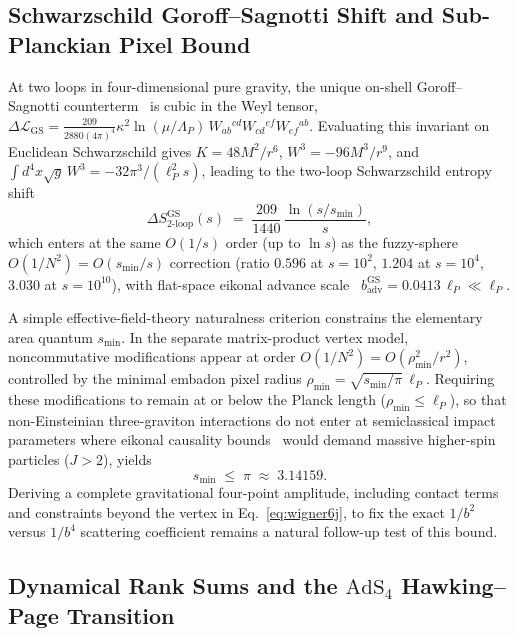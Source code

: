 \documentclass[onecolumn,11pt,aps,prd,amsmath,amssymb,nofootinbib,floatfix]{revtex4-2}
\newcommand{\lP}{\ell_P}
\begin{document}
\subsection{Schwarzschild Goroff--Sagnotti Shift and Sub-Planckian Pixel Bound}\label{sec:uv_cemz}

At two loops in four-dimensional pure gravity, the unique on-shell Goroff--Sagnotti counterterm~\cite{GoroffSagnotti1986} is cubic in the Weyl tensor, $\Delta\mathcal{L}_{\mathrm{GS}}=\frac{209}{2880(4\pi)^4}\kappa^2\ln(\mu/\Lambda_P)\,W_{ab}{}^{cd}W_{cd}{}^{ef}W_{ef}{}^{ab}$. Evaluating this invariant on Euclidean Schwarzschild gives $K=48M^2/r^6$, $W^3=-96M^3/r^9$, and $\int d^4x\sqrt{g}\,W^3=-32\pi^3/(\lP^2 s)$, leading to the two-loop Schwarzschild entropy shift
\begin{equation}\label{eq:gs_entropy}
\Delta S_{\mathrm{2\text{-}loop}}^{\mathrm{GS}}(s) \;=\; \frac{209}{1440}\,\frac{\ln(s/s_{\min})}{s},
\end{equation}
which enters at the same $O(1/s)$ order (up to $\ln s$) as the fuzzy-sphere $O(1/N^2)=O(s_{\min}/s)$ correction (ratio $0.596$ at $s=10^2$, $1.204$ at $s=10^4$, $3.030$ at $s=10^{10}$), with flat-space eikonal advance scale~\cite{CEMZ2016} $b_{\mathrm{adv}}^{\mathrm{GS}}=0.0413\,\lP\ll\lP$.

A simple effective-field-theory naturalness criterion constrains the elementary area quantum $s_{\min}$. In the separate matrix-product vertex model, noncommutative modifications appear at order $O(1/N^2)=O(\rho_{\min}^2/r^2)$, controlled by the minimal embadon pixel radius $\rho_{\min}=\sqrt{s_{\min}/\pi}\,\lP$. Requiring these modifications to remain at or below the Planck length ($\rho_{\min}\le\lP$), so that non-Einsteinian three-graviton interactions do not enter at semiclassical impact parameters where eikonal causality bounds~\cite{CEMZ2016} would demand massive higher-spin particles ($J>2$), yields
\begin{equation}\label{eq:cemz_bound}
s_{\min} \;\le\; \pi \;\approx\; 3.14159.
\end{equation}
Deriving a complete gravitational four-point amplitude, including contact terms and constraints beyond the vertex in Eq.~\eqref{eq:wigner6j}, to fix the exact $1/b^2$ versus $1/b^4$ scattering coefficient remains a natural follow-up test of this bound.

\subsection{Dynamical Rank Sums and the $\mathrm{AdS}_4$ Hawking--Page Transition}\label{sec:uv_hp}
\end{document}
